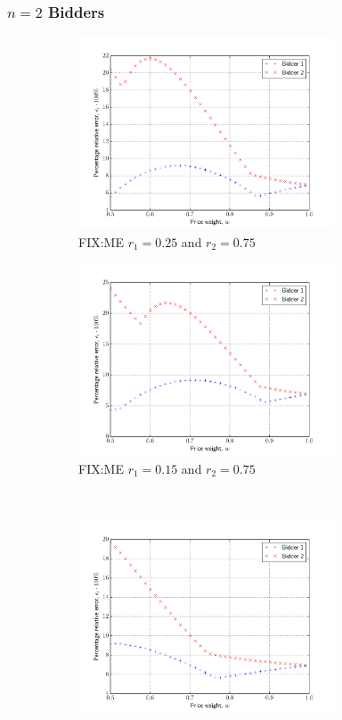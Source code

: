 \subsubsection{$n=2$ Bidders} %
\label{ssub:n_2_bidders_approximation}

\begin{figure}[p!]
  \vspace{0.5cm}
  \begin{subfigure}[b]{0.5\textwidth}
    \includegraphics[width=3in]{Approximation/Figures/compare_2_bidders_025_075}
    \caption{FIX:ME $r_1=0.25$ and $r_2=0.75$}
    \label{fig:compare_2_bidders_025_075_approximation}
  \end{subfigure}
  \begin{subfigure}[b]{0.5\textwidth}
    \includegraphics[width=3in]{Approximation/Figures/compare_2_bidders_015_075}
    \caption{FIX:ME $r_1=0.15$ and $r_2=0.75$}
    \label{fig:compare_2_bidders_015_075_approximation}
  \end{subfigure}
  \vspace{0.5cm}\\
  \begin{subfigure}[b]{0.5\textwidth}
    \includegraphics[width=3in]{Approximation/Figures/compare_2_bidders_050_075}

\end{subfigure}
\end{figure}
